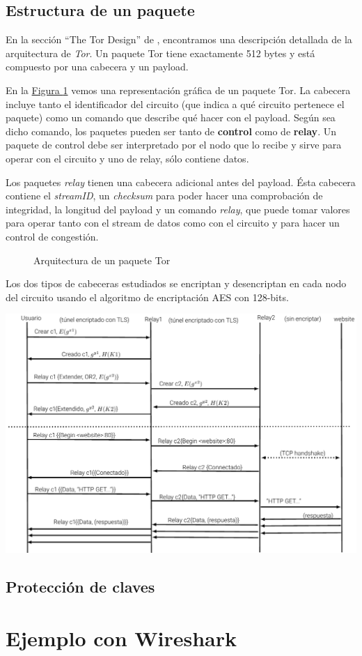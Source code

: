 \documentclass[10pt,a4paper,spanish]{article}
\begin{document}
\subsection{Estructura de un paquete}
En la sección ``The Tor Design'' de \cite{design}, encontramos una descripción detallada de la arquitectura de \textit{Tor}. Un paquete Tor tiene exactamente 512 bytes y está compuesto por una cabecera y un payload. 

En la \hyperref[paquete]{Figura \ref*{paquete}} vemos una representación gráfica de un paquete Tor. La cabecera incluye tanto el identificador del circuito (que indica a qué circuito pertenece el paquete) como un comando que describe qué hacer con el payload. Según sea dicho comando, los paquetes pueden ser tanto de \textbf{control} como de \textbf{relay}. Un paquete de control debe ser interpretado por el nodo que lo recibe y sirve para operar con el circuito y uno de relay, sólo contiene datos.

Los paquetes \textit{relay} tienen una cabecera adicional antes del payload. Ésta cabecera contiene el \textit{streamID}, un \textit{checksum} para poder hacer una comprobación de integridad, la longitud del payload y un comando \textit{relay}, que puede tomar valores para operar tanto con el stream de datos como con el circuito y para hacer un control de congestión.

\begin{figure}[!h]
    \centering
    
    \caption{Arquitectura de un paquete Tor}
    \label{paquete}
\end{figure}

Los dos tipos de cabeceras estudiados se encriptan y desencriptan en cada nodo del circuito usando el algoritmo de encriptación AES con 128-bits.

\includegraphics[width=1\textwidth]{comunicaciones}

\subsection{Protección de claves}

\section{Ejemplo con Wireshark}

\end{document}
